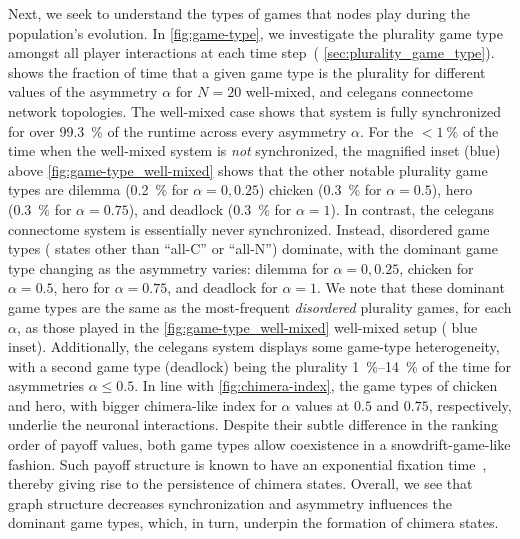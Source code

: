 \documentclass[pdflatex,lineno,referee,sn-nature]{sn-jnl}
\begin{document}
Next, we seek to understand the types of games
that nodes play during the population's evolution.
In \cref{fig:game-type}, we investigate the plurality game type
amongst all player interactions at each time step~(\cf{} \cref{sec:plurality_game_type}).
 shows the fraction of time
that a given game type is the plurality for different values
of the asymmetry $\alpha$ for
$N=20$ well-mixed,
and
\gls{celegans} connectome
network topologies.
The  well-mixed case
shows that system is fully synchronized
for over \SI{99.3}{\percent} of the runtime
across every asymmetry $\alpha$.
For the $< \SI{1}{\percent}$ of the time when the well-mixed system is
\emph{not} synchronized,
the magnified inset (blue) above
\cref{fig:game-type_well-mixed}
shows that the other notable plurality game types are
dilemma (\SI{0.2}{\percent} for $\alpha = 0, 0.25$)
chicken (\SI{0.3}{\percent} for $\alpha = 0.5$),
hero (\SI{0.3}{\percent} for $\alpha = 0.75$),
and
deadlock (\SI{0.3}{\percent} for $\alpha = 1$).
In contrast, the
 \gls{celegans} connectome system
is essentially never synchronized.
Instead, disordered game types (\ie{} states other than ``all-C'' or ``all-N'')
dominate,
with the dominant game type changing as the asymmetry varies:
dilemma for $\alpha = 0, 0.25$, chicken for $\alpha = 0.5$,
hero for $\alpha = 0.75$, and deadlock for $\alpha = 1$.
We note that these dominant game types
are the same as the most-frequent \emph{disordered} plurality games,
for each $\alpha$, as those played in
the \cref{fig:game-type_well-mixed} well-mixed setup (\cf{} blue inset).
Additionally, the \gls{celegans} system displays
some game-type heterogeneity, with
a second game type (deadlock) being the plurality
\SIrange{1}{14}{\percent} of the time
for asymmetries $\alpha \le 0.5$.
In line with \cref{fig:chimera-index}, the game types of chicken and hero,
with bigger chimera-like index for $\alpha$ values at $0.5$ and $0.75$, respectively,
underlie the neuronal interactions.
Despite their subtle difference in the ranking order of payoff values,
both game types allow coexistence in a snowdrift-game-like fashion.
Such payoff structure is known to have
an exponential fixation time~\citep{antal2006fixation},
thereby giving rise to the persistence of chimera states.
Overall, we see that graph structure decreases synchronization
and asymmetry influences the dominant game types, which, in turn,
underpin the formation of chimera states.
\end{document}
